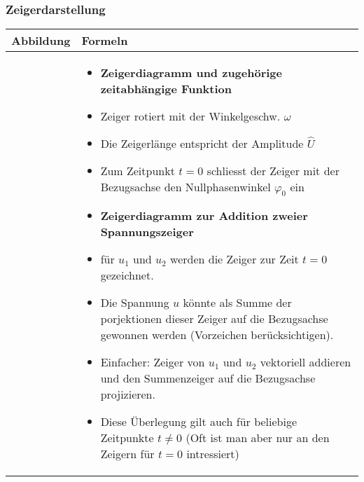 \subsubsection{Zeigerdarstellung}
\begin{tabular}{ | m{9cm} | m{9cm}  | }
	\hline
	Abbildung & Formeln \\ \hline
	\hline
	\begin{minipage}{.1\textwidth}
		\tabImg[width=9cm]{images/Zeigerdiagramm.png}
	\end{minipage}
	&
	\begin{itemize}
		\item \textbf{Zeigerdiagramm und zugehörige zeitabhängige Funktion}
		\item[] Zeiger rotiert mit der Winkelgeschw. $\omega$
		\item[] Die Zeigerlänge entspricht der Amplitude $\hat{U}$
		\item[] Zum Zeitpunkt $t=0$ schliesst der Zeiger mit der Bezugsachse den Nullphasenwinkel $\varphi_0$ ein
		\item \textbf{Zeigerdiagramm zur Addition zweier Spannungszeiger}
		\item[] für $u_1$ und $u_2$ werden die Zeiger zur Zeit $t=0$ gezeichnet.
		\item[] Die Spannung $u$ könnte als Summe der porjektionen dieser Zeiger auf die Bezugsachse gewonnen werden (Vorzeichen berücksichtigen).
		\item[] Einfacher: Zeiger von $u_1$ und $u_2$ vektoriell addieren und den Summenzeiger auf die Bezugsachse projizieren.
		\item[] Diese Überlegung gilt auch für beliebige Zeitpunkte $t\neq 0$ (Oft ist man aber nur an den Zeigern für $t=0$ intressiert)
	\end{itemize}   	
	\\ \hline
	\end{tabular}

